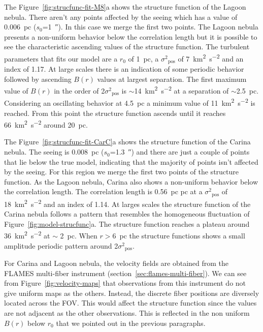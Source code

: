 \documentclass[fleqn,usenatbib, useAMS, a4paper]{mnras}
\newcommand\pos{\ensuremath{_{\mathrm{pos}}}}
\begin{document}
The Figure~\ref{fig:strucfunc-fit-M8}a shows the structure function of the Lagoon nebula.
There aren't any points affected by the seeing which has a value of \SI{0.006}{pc} (\(s_0\)=\SI{1}{\arcsecond}).
In this case we merge the first two points.
The Lagoon nebula presents a non-uniform behavior below the correlation length but it is possible to see the characteristic ascending values of the structure function.
The turbulent parameters that fits our model are a \(r_0\) of \SI{1}{pc}, a \(\sigma^2\pos\) of \SI{7}{km^{2}.s^{-2}} and an index of \num{1.17}.
At large scales there is an indication of some periodic behavior followed by ascending \(B(r)\) values at largest separation.
The first maximum value of \(B(r)\) in the order of 2\(\sigma^2\pos\) is \(\sim\)\SI{14}{km^{2}.s^{-2}} at a separation of \(\sim\)\SI{2.5}{pc}. 
Considering an oscillating behavior at \SI{4.5}{pc} a minimum value of \SI{11}{km^{2}.s^{-2}} is reached.
From this point the structure function ascends until it reaches \SI{66}{km^{2}.s^{-2}} around \SI{20}{pc}.

The Figure~\ref{fig:strucfunc-fit-CarC}a shows the structure function of the Carina nebula.
The seeing is \SI{0.008}{pc} (\(s_0\)=\SI{1.3}{\arcsecond}) and there are just a couple of points that lie below the true model, indicating that the majority of points isn't affected by the seeing.
For this region we merge the first two points of the structure function.
As the Lagoon nebula, Carina also shows a non-uniform behavior below the correlation length.
The correlation length is \SI{0.56}{pc} pc at a \(\sigma^2\pos\) of \SI{18}{km^{2}.s^{-2}} and an index of \num{1.14}.
At larges scales the structure function of the Carina nebula follows a pattern that resembles the homogeneous fluctuation of Figure~\ref{fig:model-strucfunc}a.
The structure function reaches a plateau around \SI{36}{km^{2}.s^{-2}} at \(\sim\) \SI{2}{pc}.
When \(r >\)\SI{6}{pc} the structure functions shows a small amplitude periodic pattern around 2\(\sigma^2\pos\).

For Carina and Lagoon nebula, the velocity fields are obtained from the FLAMES multi-fiber instrument (section~\ref{sec:flames-multi-fiber}). 
We can see from Figure~\ref{fig:velocity-maps} that observations from this instrument do not give uniform maps as the others. 
Instead, the discrete fiber positions are diversely located across the FOV.
This would affect the structure function since the values are not adjacent as the other observations.
This is reflected in the non uniform \(B(r)\) below  \(r_0\) that we pointed out in the previous paragraphs.
\end{document}
